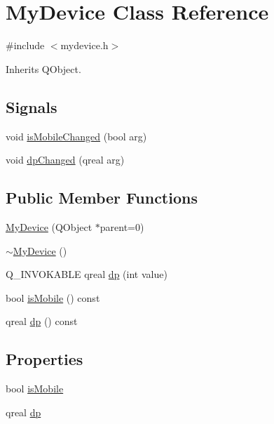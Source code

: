 \hypertarget{class_my_device}{\section{My\+Device Class Reference}
\label{class_my_device}
}


{\ttfamily \#include $<$mydevice.\+h$>$}



Inherits Q\+Object.

\subsection*{Signals}
\begin{DoxyCompactItemize}
\item 
void \hyperlink{class_my_device_ae9986d0259fafb89ddfe5e8692fcfe04}{is\+Mobile\+Changed} (bool arg)
\item 
void \hyperlink{class_my_device_ac50117093825429d075e2ce03a33da53}{dp\+Changed} (qreal arg)
\end{DoxyCompactItemize}
\subsection*{Public Member Functions}
\begin{DoxyCompactItemize}
\item 
\hyperlink{class_my_device_a303b0b88e9e10dc84814324f46928fb1}{My\+Device} (Q\+Object $\ast$parent=0)
\item 
\hyperlink{class_my_device_ab85d97ee1ad7141ac959345fbfab7d46}{$\sim$\+My\+Device} ()
\item 
Q\+\_\+\+I\+N\+V\+O\+K\+A\+B\+L\+E qreal \hyperlink{class_my_device_aefb0c3698f180d30b6c48b92e95eaf3f}{dp} (int value)
\item 
bool \hyperlink{class_my_device_a1cde4c8770ff44450bea804c12256994}{is\+Mobile} () const 
\item 
qreal \hyperlink{class_my_device_a38dc493c4ffe5b5b5b3fa471d695aef3}{dp} () const 
\end{DoxyCompactItemize}
\subsection*{Properties}
\begin{DoxyCompactItemize}
\item 
bool \hyperlink{class_my_device_ae49ce2ac468130dca319bfd4bb08b3e1}{is\+Mobile}
\item 
qreal \hyperlink{class_my_device_a8c0ba6fac9e1ec8bb222542ed4881985}{dp}
\end{DoxyCompactItemize}


